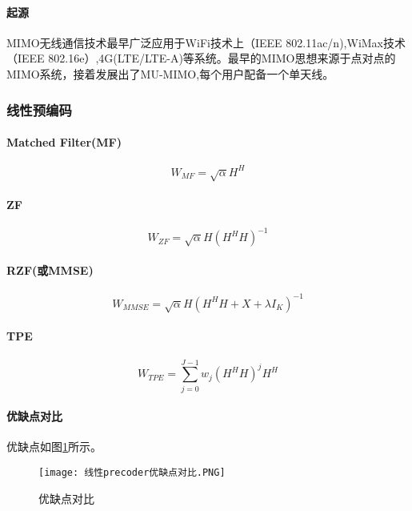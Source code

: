 \paragraph{起源}
MIMO无线通信技术最早广泛应用于WiFi技术上（IEEE 802.11ac/n),WiMax技术（IEEE 802.16e）,4G(LTE/LTE-A)等系统。最早的MIMO思想来源于点对点的MIMO系统，接着发展出了MU-MIMO,每个用户配备一个单天线。
\subsubsection{线性预编码}
\paragraph{Matched Filter(MF)}
\begin{equation}
    W_{MF} = \sqrt{\alpha} H^H
\end{equation}
\paragraph{ZF}
\begin{equation}
    W_{ZF} = \sqrt{\alpha} H(H^HH)^{-1}
\end{equation}
\paragraph{RZF(或MMSE)}
\begin{equation}
    W_{MMSE} = \sqrt{\alpha} H(H^HH+X+\lambda I_K)^{-1}
\end{equation}
\paragraph{TPE}
\begin{equation}
    W_{TPE} = \sum_{j=0}^{J-1}w_j(H^HH)^jH^H
\end{equation}
\paragraph{优缺点对比}
\par
优缺点如图\ref{kjdfgshafgdad}所示。
\begin{figure}[ht]
    \centering
    \texttt{[image: 线性precoder优缺点对比.PNG]}
    \caption{优缺点对比}
    \label{kjdfgshafgdad}
\end{figure}

